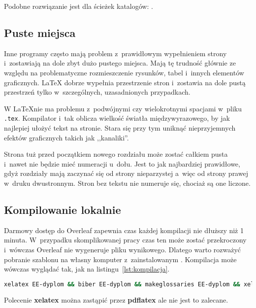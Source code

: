 Podobne rozwiązanie jest dla ścieżek katalogów: .

\subsection{Puste miejsca}
Inne programy często mają problem z~prawidłowym wypełnieniem strony i~zostawiają na dole zbyt dużo pustego miejsca. Mają tę trudność głównie ze względu na problematyczne rozmieszczenie rysunków, tabel i~innych elementów graficznych. \LaTeX{} dobrze wypełnia przestrzenie stron i~zostawia na dole pustą przestrzeń tylko w~szczególnych, uzasadnionych przypadkach.

W \LaTeX nie ma problemu z~podwójnymi  czy wielokrotnymi      spacjami w~pliku \texttt{.tex}. Kompilator i~tak oblicza wielkość światła międzywyrazowego, by jak najlepiej ułożyć tekst na stronie. Stara się przy tym uniknąć nieprzyjemnych efektów graficznych takich jak ,,kanaliki''.

Strona tuż przed początkiem nowego rozdziału może zostać całkiem pusta i~nawet nie będzie mieć numeracji u~dołu. Jest to jak najbardziej prawidłowe, gdyż rozdziały mają zaczynać się od strony nieparzystej a~więc od strony prawej w~druku dwustronnym. Stron bez tekstu nie numeruje się, chociaż są one liczone.

\subsection{Kompilowanie lokalnie}
Darmowy dostęp do Overleaf zapewnia czas każdej kompilacji nie dłuższy niż 1 minuta. W~przypadku skomplikowanej pracy czas ten może zostać przekroczony i~wówczas Overleaf nie wygeneruje pliku wynikowego. Dlatego warto rozważyć pobranie szablonu na własny komputer z~zainstalowanym . Kompilacja może wówczas wyglądać tak, jak na listingu~\ref{lst:kompilacja}.

\begin{lstlisting}[language=bash,
    caption={Kompilacja pracy dyplomowej lokalnie},
    label={lst:kompilacja}]
xelatex EE-dyplom && biber EE-dyplom && makeglossaries EE-dyplom && xelatex EE-dyplom && xelatex EE-dyplom
\end{lstlisting}

Polecenie \textbf{xelatex} można zastąpić przez \textbf{pdflatex} ale nie jest to zalecane.
